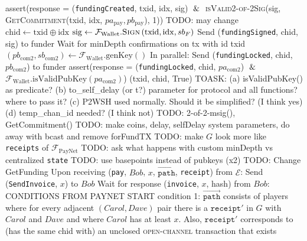 \begin{algorithmic}[1]
        \EndIndent
      \EndIndent
      \State assert(response = (\texttt{fundingCreated}, txid, idx, sig) $\And$
      \textsc{isValid2-of-2Sig}(sig, \textsc{GetCommitment}(txid, idx,
      $pa_{\mathrm{pay}}, pb_{\mathrm{pay}}$), 1)) TODO: may change
      \State $\mathrm{chid} \gets \mathrm{txid} \oplus \mathrm{idx}$
      \State $\mathrm{sig} \gets
      \mathcal{F}_{\mathrm{Wallet}}.\textsc{Sign}\left(\mathrm{txid},
      \mathrm{idx}, sb_F\right)$
      \State Send (\texttt{fundingSigned}, chid, sig) to funder
      \State Wait for minDepth confirmations on tx with id txid
      \State $\left(pb_{\mathrm{com}2}, sb_{\mathrm{com}2}\right) \gets
      \mathcal{F}_{\mathrm{Wallet}}.\mathrm{genKey}\left(\right)$
      \State In parallel:
      \Indent
        \State Send (\texttt{fundingLocked}, chid, $pb_{\mathrm{com}2}$) to
        funder
        \State assert(response = (\texttt{fundingLocked}, chid,
        $pa_{\mathrm{com}2}$) $\And$
        \Indent
          \State $\mathcal{F}_{\mathrm{Wallet}}.\mathrm{isValidPubKey}
          \left(pa_{\mathrm{com}2}\right)$)
        \EndIndent
      \EndIndent
      \State \Return (txid, chid, True)
    \EndFunction
    \State
    \State TOASK: (a) isValidPubKey() as predicate? (b) to\_self\_delay (or t?)
    parameter for protocol and all functions? where to pass it? (c) P2WSH used
    normally. Should it be simplified? (I think yes) (d) temp\_chan\_id needed?
    (I think not)
    \State TODO: 2-of-2-msig(), GetCommitment()
    \State TODO: make coins, delay, selfDelay system parameters, do away with
    bcast and remove forFundTX
    \State TODO: make $G$ look more like \texttt{receipts} of
    $\mathcal{F}_{\mathrm{PayNet}}$
    \State TODO: ask what happens with custom minDepth vs centralized
    \texttt{state}
    \State TODO: use basepoints instead of pubkeys (x2)
    \State TODO: Change GetFunding
    \State
    \State Upon receiving (\texttt{pay}, $Bob$, $x$,
    $\overrightarrow{\mathtt{path}}$, \texttt{receipt}) from $\mathcal{E}$:
      \State Send (\texttt{SendInvoice}, $x$) to $Bob$
      \State Wait for response (\texttt{invoice}, $x$, hash) from $Bob$:
      \Indent
        \State CONDITIONS FROM PAYNET START
        \State condition 1: $\overrightarrow{\mathtt{path}}$ consists of players
        where for every adjacent $\left(Carol, Dave\right)$ pair there is a
        $\mathtt{receipt}'$ in $G$ with $Carol$ and $Dave$ and where $Carol$ has
        at least $x$. Also, $\mathtt{receipt}'$ corresponds to (has the same
        chid with) an unclosed \textsc{open-channel} transaction that exists

\end{algorithmic}

